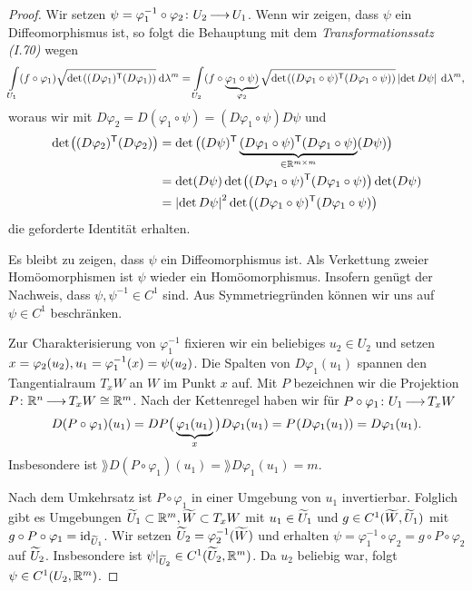 \documentclass[skript.tex]{subfiles}
\begin{document}
\begin{proof}
	Wir setzen $\psi = \varphi_1^{-1} \circ \varphi_2 \colon U_2 \kern -1pt \longrightarrow \kern -1pt U_1$. Wenn wir zeigen, dass $\psi$ ein Diffeomorphismus ist, so folgt die Behauptung mit dem \textit{Transformationssatz (I.70)} wegen
	\[
		\lint_{U_1} (f\circ \varphi_1) \sqrt{\det \pr{(D\varphi_1)^\tp (D\varphi_1)}} \md \lambda^m = \lint_{U_2} (f\circ \underbrace{\varphi_1 \circ \psi)}_{\varphi_2} \sqrt{\det \pr{(D\varphi_1 \circ \psi)^\tp (D\varphi_1 \circ \psi)}} \abs{\det D\psi} \md \lambda^m,
	\]
	woraus wir mit $D\varphi_2 = D(\varphi_1 \circ \psi) = (D\varphi_1 \circ \psi) D\psi$ und
	\begin{align*}
		\det \pr{(D\varphi_2)^\tp (D\varphi_2)} &= \det \big( (D\psi)^\tp \underbrace{(D\varphi_1 \circ \psi)^\tp (D\varphi_1 \circ \psi)}_{\in \R^{m\times m}} (D\psi) \big)\\
		&= \det (D\psi) \det \pr{(D\varphi_1 \circ \psi)^\tp (D\varphi_1 \circ \psi)} \det (D\psi)\\
		&= \abs{\det D\psi}^2 \det \pr{(D\varphi_1 \circ \psi)^\tp (D\varphi_1 \circ \psi)}
	\end{align*}
	die geforderte Identität erhalten.
	
	Es bleibt zu zeigen, dass $\psi$ ein Diffeomorphismus ist. Als Verkettung zweier Homöomorphismen ist $\psi$ wieder ein Homöomorphismus. Insofern genügt der Nachweis, dass $\psi, \psi^{-1} \in C^1$ sind. Aus Symmetriegründen können wir uns auf $\psi \in C^1$ beschränken. 
	
	Zur Charakterisierung von $\varphi_1^{-1}$ fixieren wir ein beliebiges $u_2 \in U_2$ und setzen $x=\varphi_2(u_2),\\u_1=\varphi_1^{-1}(x) = \psi(u_2)$. Die Spalten von $D\varphi_1(u_1)$ spannen den Tangentialraum $T_x W$ an $W$ im Punkt $x$ auf. Mit $P$ bezeichnen wir die Projektion $P\colon {\mathbb{R}^n} \kern -1pt \longrightarrow \kern -1pt T_x W \cong \mathbb{R}^m$. Nach der Kettenregel haben wir für $P \circ \varphi_1 \colon U_1 \kern -1pt \longrightarrow \kern -1pt T_x W$
	\[
		D(P\circ \varphi_1)(u_1) = DP\big( \underbrace{\varphi_1(u_1)}_{x} \big) D\varphi_1(u_1) = P\pr{D\varphi_1(u_1)} = D\varphi_1(u_1).
	\]
	Insbesondere ist $\rang D(P\circ\varphi_1)(u_1) = \rang D\varphi_1(u_1) = m$.
	
	Nach dem Umkehrsatz ist $P\circ \varphi_1$ in einer Umgebung von $u_1$ invertierbar. Folglich gibt es Umgebungen $\widetilde{U}_1 \subset \mathbb{R}^m, \widetilde{W} \subset T_x W$ mit $u_1 \in \widetilde{U}_1$ und $g \in C^1(\widetilde{W}, \widetilde{U}_1)$ mit $g \circ P \circ \varphi_1 = \mathrm{id}_{\widetilde{U}_1}$. Wir setzen $\widetilde{U}_2 = \varphi_2^{-1}(\widetilde{W})$ und erhalten $\psi = \varphi_1^{-1} \circ \varphi_2 = g \circ P \circ \varphi_2$ auf $\widetilde{U}_2$. Insbesondere ist $\psi|_{\widetilde{U}_2} \in C^1(\widetilde{U}_2, \mathbb{R}^m)$. Da $u_2$ beliebig war, folgt $\psi \in C^1(U_2, \mathbb{R}^m)$.
\end{proof}
\end{document}
